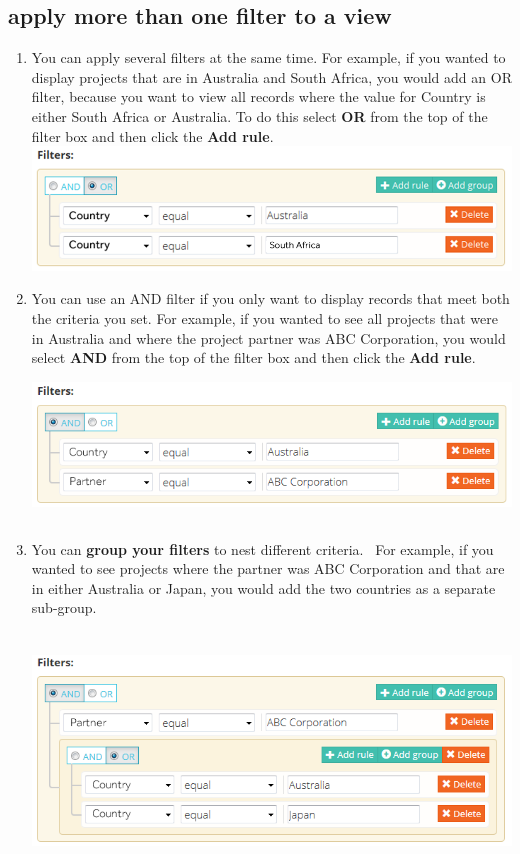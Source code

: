 \documentclass{ctrlo-int-toc}
\begin{document}
\subsection[apply more than one filter to a view]{apply more than one filter to a view}
\begin{enumerate}
\item You can apply several filters at the same time. For example, if you wanted to display projects that are in Australia and South Africa, you would add an OR filter, because you want to view all records where the value for Country is either South Africa or Australia. To do this select \textbf{OR} from the top of the filter box and then click the \textbf{Add rule}.\newline
\includegraphics{userguide-img/userguide-img003.png}
 

\item You can use an AND filter if you only want to display records that meet both the criteria you set. For example, if you wanted to see all projects that were in Australia and where the project partner was ABC Corporation, you would select \textbf{AND} from the top of the filter box and then click the \textbf{Add rule}.\newline
\includegraphics[width=15.667cm,height=4.055cm]{userguide-img/userguide-img004.png}
 

\item You can \textbf{group your filters} to nest different criteria. \ For example, if you wanted to see projects where the partner was ABC Corporation and that are in either Australia or Japan, you would add the two countries as a separate sub-group.

\includegraphics[width=15.693cm,height=6.272cm]{userguide-img/userguide-img005.png}
 


\end{enumerate}
\end{document}
